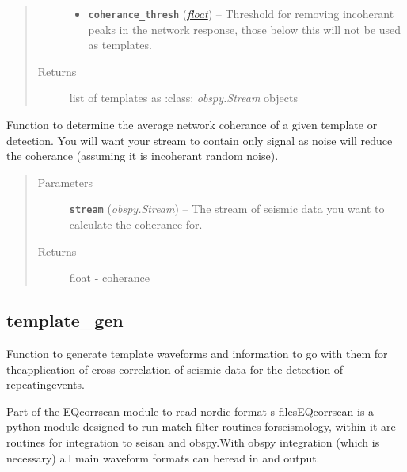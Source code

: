 \documentclass[a4paper,10pt,english]{sphinxmanual}
\begin{document}
\begin{fulllineitems}
\begin{quote}
\begin{description}
\begin{itemize}
\item {} 
\textbf{\texttt{coherance\_thresh}} (\href{https://docs.python.org/library/functions.html\#float}{\emph{float}}) -- Threshold for removing incoherant peaks in the            network response, those below this will not be used as templates.

\end{itemize}

\item[{Returns}] \leavevmode
list of templates as :class: \emph{obspy.Stream} objects

\end{description}\end{quote}

\end{fulllineitems}


\begin{fulllineitems}
\label{core:bright_lights.coherance}
Function to determine the average network coherance of a given template or
detection.  You will want your stream to contain only signal as noise
will reduce the coherance (assuming it is incoherant random noise).
\begin{quote}\begin{description}
\item[{Parameters}] \leavevmode
\textbf{\texttt{stream}} (\emph{obspy.Stream}) -- The stream of seismic data you want to calculate the
coherance for.

\item[{Returns}] \leavevmode
float - coherance

\end{description}\end{quote}

\end{fulllineitems}



\subsection{template\_gen}
\label{core:template-gen}\label{core:module-template_gen}
Function to generate template waveforms and information to go with them for theapplication of cross-correlation of seismic data for the detection of repeatingevents.

Part of the EQcorrscan module to read nordic format s-filesEQcorrscan is a python module designed to run match filter routines forseismology, within it are routines for integration to seisan and obspy.With obspy integration (which is necessary) all main waveform formats can beread in and output.
\end{document}
